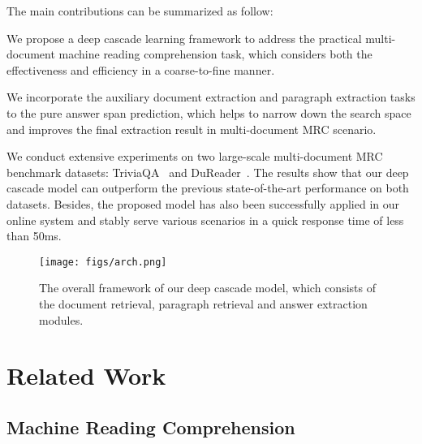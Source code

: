 \documentclass[letterpaper]{article} \usepackage{aaai19}  \usepackage{graphicx}
\newenvironment{myitemize2}[1][]{\begin{list}{}
    {
     \setlength{\leftmargin}{5mm}     \setlength{\parsep}{0.5mm}         \setlength{\topsep}{0mm}         \setlength{\itemsep}{0mm}        \setlength{\labelsep}{0.5em}     \setlength{\itemindent}{0mm}    \setlength{\listparindent}{6mm} }}
{\end{list}}
\begin{document}
The main contributions can be summarized as follow:
\begin{myitemize2}
	\item We propose a deep cascade learning framework to address the practical multi-document machine reading comprehension task,  which considers both the effectiveness and efficiency in a coarse-to-fine manner.
	\item We incorporate the auxiliary document extraction and paragraph extraction tasks to the pure answer span prediction, which helps to narrow down the search space and improves the final extraction result in multi-document MRC scenario.
	\item We conduct extensive experiments on two large-scale multi-document MRC benchmark datasets: TriviaQA~\cite{joshi2017triviaqa} and DuReader~\cite{he2017dureader}. The results show that our deep cascade model can outperform the previous state-of-the-art performance on both datasets. Besides,  the proposed model has also been successfully applied in our online system and stably serve various scenarios in a quick response time of less than 50ms.
\end{myitemize2}



\begin{figure}
\centering
\texttt{[image: figs/arch.png]}\vspace{-2mm}
\caption{The overall framework of our deep cascade model, which consists of the document retrieval, paragraph retrieval and answer extraction modules.} \vspace{-3mm}
\label{fig:arch}
\end{figure}

\section{Related Work}

\subsection{Machine Reading Comprehension}
\end{document}
